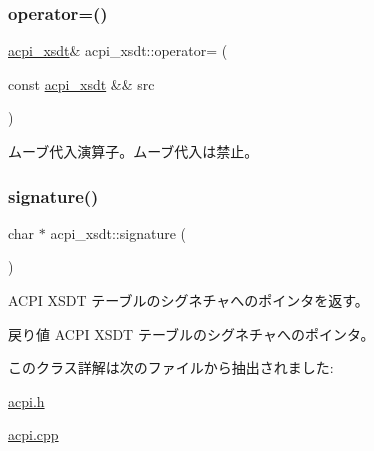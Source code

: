\subsubsection{\texorpdfstring{operator=()}{operator=()}\hspace{0.1cm}{\footnotesize\ttfamily [2/2]}}
{\footnotesize\ttfamily \hyperlink{classacpi__xsdt}{acpi\+\_\+xsdt}\& acpi\+\_\+xsdt\+::operator= (\begin{DoxyParamCaption}\item[{const \hyperlink{classacpi__xsdt}{acpi\+\_\+xsdt} \&\&}]{src }\end{DoxyParamCaption})\hspace{0.3cm}{\ttfamily [delete]}}

ムーブ代入演算子。ムーブ代入は禁止。 \hypertarget{classacpi__xsdt_a6da0f8215c9d893fc44ad8d88eacb335}{}\label{classacpi__xsdt_a6da0f8215c9d893fc44ad8d88eacb335} 
\subsubsection{\texorpdfstring{signature()}{signature()}}
{\footnotesize\ttfamily char $\ast$ acpi\+\_\+xsdt\+::signature (\begin{DoxyParamCaption}{ }\end{DoxyParamCaption})}

A\+C\+PI X\+S\+DT テーブルのシグネチャへのポインタを返す。 \begin{DoxyReturn}{戻り値}
A\+C\+PI X\+S\+DT テーブルのシグネチャへのポインタ。 
\end{DoxyReturn}


このクラス詳解は次のファイルから抽出されました\+:\begin{DoxyCompactItemize}
\item 
\hyperlink{acpi_8h}{acpi.\+h}\item 
\hyperlink{acpi_8cpp}{acpi.\+cpp}\end{DoxyCompactItemize}
